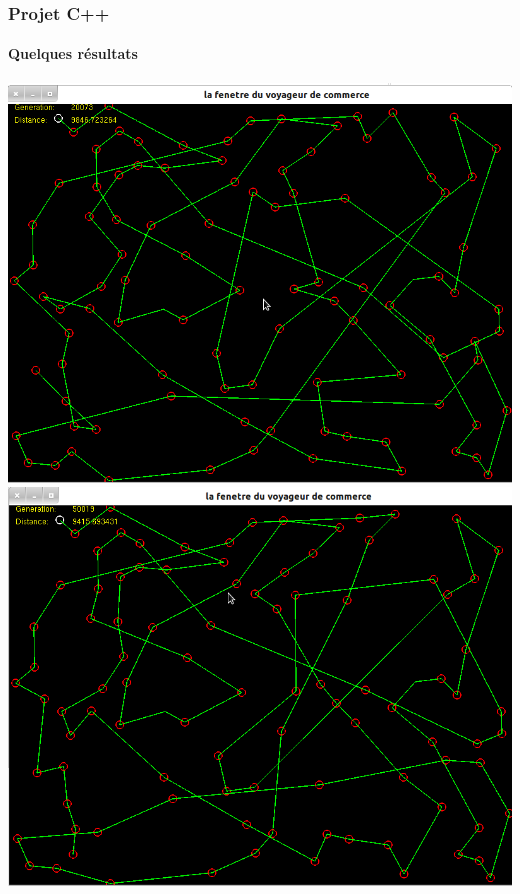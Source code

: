 \documentclass{beamer}
\begin{document}
	\begin{frame}
	\frametitle{Projet C++}
	\framesubtitle{Quelques résultats}
	
	\includegraphics[scale=0.2]{5.png}
	\includegraphics[scale=0.2]{6.png}
			
	\end{frame}		
	
\end{document}
